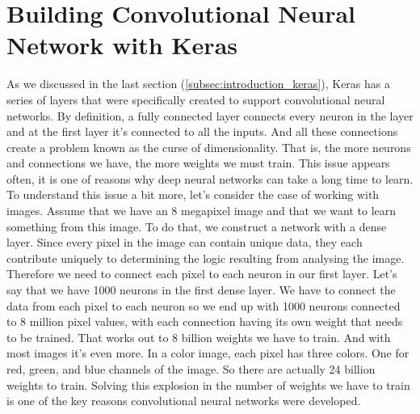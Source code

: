 \section{Building Convolutional Neural Network with Keras}
\label{sec:buildcnn}
%
As we discussed in the last section (\ref{subsec:introduction_keras}), Keras has a 
series of layers that were specifically created to support convolutional 
neural networks.
By definition, a fully connected layer connects every neuron in the layer and 
at the first layer it's connected to all the inputs. 
And all these connections create a problem known as the curse of 
dimensionality. 
That is, the more neurons and connections we have, the more weights we must 
train. 
This issue appears often, it is one of reasons why deep neural networks can 
take a long time to learn. 
To understand this issue a bit more, let's consider the case of working with 
images. 
Assume that we have an 8 megapixel image and that we want to learn something 
from this image. 
To do that, we construct a network with a dense layer. 
Since every pixel in the image can contain unique data, they each contribute 
uniquely to determining the logic resulting from analysing the image. 
Therefore we need to connect each pixel to each neuron in our first layer. 
Let's say that we have 1000 neurons in the first dense layer.
We have to connect the data from each pixel to each neuron so we end up with 
1000 neurons connected to 8 million pixel values, with each connection having 
its own weight that needs to be trained. 
That works out to 8 billion weights we have to train. 
And with most images it's even more. In a color image, each pixel has three 
colors. 
One for red, green, and blue channels of the image. 
So there are actually 24 billion weights to train.
Solving this explosion in the number of weights we have to train is one of the 
key reasons convolutional neural networks were developed. 
%
